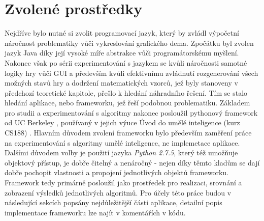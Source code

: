 \section{Zvolené prostředky}
Nejdříve bylo nutné si zvolit programovací jazyk, který by zvládl výpočetní náročnost problematiky vůči vykreslování grafického dema. Zpočátku byl zvolen jazyk Java díky její vysoké míře abstrakce vůči programátorskému myšlení. Nakonec však po sérii experimentování s jazykem se kvůli náročnosti samotné logiky hry vůči GUI a především kvůli efektivnímu zvládnutí rozgenerování všech možných stavů hry a dodržení matematických vzorců, jež byly stanoveny v předchozí teoretické kapitole, přešlo k hledání náhradního řešení. Tím se stalo hledání aplikace, nebo frameworku, jež řeší podobnou problematiku. Základem pro studii a experimentování s algoritmy nakonec posloužil pythonový framework od UC Berkeley \cite{pacmanProjects}, používaný v jejich výuce Úvod do umělé inteligence (kurz CS188) \cite{berkeley}. Hlavním důvodem zvolení frameworku bylo především zaměření práce na experimentování s algoritmy umělé inteligence, ne implemetace aplikace. Dalšími důvodem volby je použití jazyka \textit{Python 2.7.5}, který též umožňuje objektový přístup, je dobře čitelný a nenáročný - nejen díky těmto kladům se dají dobře pochopit vlastnosti a propojení jednotlivých objektů frameworku. Framework tedy primárně posloužil jako prostředek pro realizaci, srovnání a zobrazení výsledků jednotlivých algoritmů.
Pro účely této práce budou v následující sekcích popsány nejdůležitější části aplikace, detailní popis implementace frameworku lze najít v komentářích v kódu.

